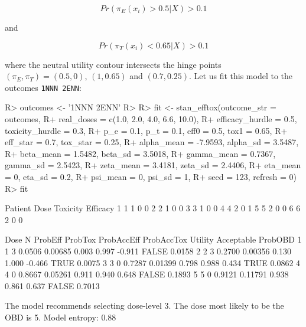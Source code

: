 \documentclass[article]{jss}
\begin{document}
\begin{equation}
Pr(\pi_E(x_i) > 0.5 | X) > 0.1
\end{equation}

and

\begin{equation}
Pr(\pi_T(x_i) <0.65 | X) > 0.1
\end{equation}

where the neutral utility contour intersects the hinge points
\((\pi_E, \pi_T) = (0.5, 0)\), \((1, 0.65)\) and \((0.7, 0.25)\). Let us
fit this model to the outcomes \texttt{1NNN\ 2ENN}:

\begin{CodeChunk}

\begin{CodeInput}
R> outcomes <- '1NNN 2ENN'
R> 
R> fit <- stan_efftox(outcome_str = outcomes,
R+                    real_doses = c(1.0, 2.0, 4.0, 6.6, 10.0),
R+                    efficacy_hurdle = 0.5, toxicity_hurdle = 0.3,
R+                    p_e = 0.1, p_t = 0.1, eff0 = 0.5, tox1 = 0.65,
R+                    eff_star = 0.7, tox_star = 0.25,
R+                    alpha_mean = -7.9593, alpha_sd = 3.5487,
R+                    beta_mean = 1.5482, beta_sd = 3.5018,
R+                    gamma_mean = 0.7367, gamma_sd = 2.5423,
R+                    zeta_mean = 3.4181, zeta_sd = 2.4406,
R+                    eta_mean = 0, eta_sd = 0.2,
R+                    psi_mean = 0, psi_sd = 1, 
R+                    seed = 123, refresh = 0)
R> fit
\end{CodeInput}

\begin{CodeOutput}
  Patient Dose Toxicity Efficacy
1       1    1        0        0
2       2    1        0        0
3       3    1        0        0
4       4    2        0        1
5       5    2        0        0
6       6    2        0        0

  Dose N ProbEff ProbTox ProbAccEff ProbAccTox Utility Acceptable ProbOBD
1    1 3  0.0506 0.00685      0.003      0.997  -0.911      FALSE  0.0158
2    2 3  0.2700 0.00356      0.130      1.000  -0.466       TRUE  0.0075
3    3 0  0.7287 0.01399      0.798      0.988   0.434       TRUE  0.0862
4    4 0  0.8667 0.05261      0.911      0.940   0.648      FALSE  0.1893
5    5 0  0.9121 0.11791      0.938      0.861   0.637      FALSE  0.7013

The model recommends selecting dose-level 3.
The dose most likely to be the OBD is 5.
Model entropy: 0.88
\end{CodeOutput}
\end{CodeChunk}
\end{document}
